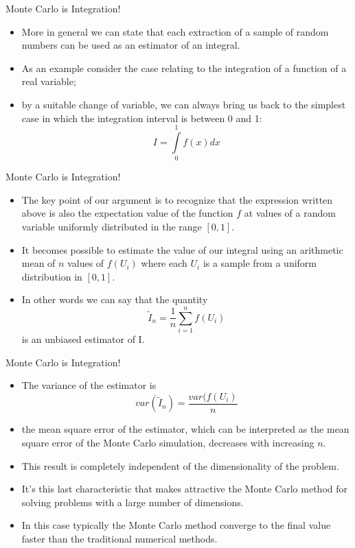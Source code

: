 \documentclass[11pt]{beamer}
\newcommand*{\itemimg}[1]{%
  \raisebox{-.3\baselineskip}{%
    \texttt{[image: \#1]}%
  }%
}
\begin{document}
\begin{frame}{Monte Carlo is Integration!}
\begin{itemize}
\item More in general we can state that each extraction of a sample of random numbers can be used as an estimator of an integral. 
\item As an example consider the case relating to the integration of a function of a real variable; 
\item by a suitable change of variable, we can always bring us back to the simplest case in which the integration interval is between 0 and 1:
$$I = \int\limits_0^1 f(x)dx$$
\end{itemize}
\end{frame}
\begin{frame}{Monte Carlo is Integration!}
\begin{itemize}
\item The key point of our argument is to recognize that the expression written above is also the expectation value of the function $f$ at values of a random variable uniformly distributed in the range $[0, 1]$. 
\item It becomes possible to estimate the value of our integral using an arithmetic mean of $n$ values of $f (U_i)$ where each $U_i$ is a sample from a uniform distribution in $[0, 1]$. 
\item In other words we can say that the quantity
$$
\tilde{I}_n = \frac{1}{n} \sum\limits_{i=1}^n f(U_i)
$$
is an unbiased estimator of I.
\end{itemize}
\end{frame}
\begin{frame}{Monte Carlo is Integration!}
\begin{itemize}
\item  The variance of the estimator is
$$ var \left( \tilde{I}_n \right) = \frac{var(f(U_i)}{n} $$
\item the mean square error of the estimator, which can be interpreted as the mean square error of the Monte Carlo simulation, decreases with increasing $n$. 
\item [\itemimg{./img/key_point.jpg}] This result is completely independent of the dimensionality of the problem. 
\item [\itemimg{./img/key_point.jpg}] It's this last characteristic that makes attractive the Monte Carlo method for solving problems with a large number of dimensions. 
\item In this case typically the Monte Carlo method converge to the final value faster than the traditional numerical methods.
\end{itemize}
\end{frame}
\end{document}
